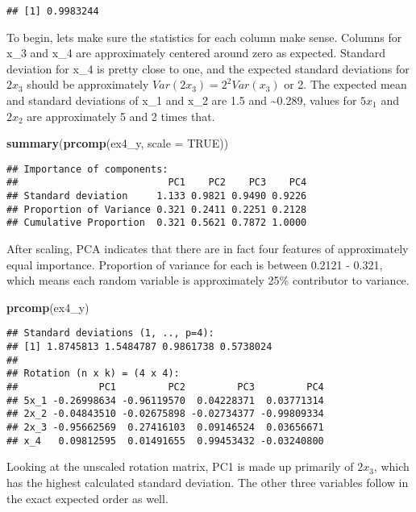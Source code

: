 \documentclass[
]{article}
\newenvironment{Shaded}{\begin{snugshade}}{\end{snugshade}}
\newcommand{\DataTypeTok}[1]{\textcolor[rgb]{0.13,0.29,0.53}{#1}}
\newcommand{\KeywordTok}[1]{\textcolor[rgb]{0.13,0.29,0.53}{\textbf{#1}}}
\newcommand{\NormalTok}[1]{#1}
\newcommand{\OtherTok}[1]{\textcolor[rgb]{0.56,0.35,0.01}{#1}}
\begin{document}
\begin{verbatim}
## [1] 0.9983244
\end{verbatim}

To begin, lets make sure the statistics for each column make sense.
Columns for x\_3 and x\_4 are approximately centered around zero as
expected. Standard deviation for x\_4 is pretty close to one, and the
expected standard deviations for \(2x_3\) should be approximately
\(Var(2x_3) = 2^2 Var(x_3)\) or 2. The expected mean and standard
deviations of x\_1 and x\_2 are 1.5 and \textasciitilde0.289, values for
\(5x_1\) and \(2x_2\) are approximately 5 and 2 times that.

\begin{Shaded}
\begin{Highlighting}[]
\KeywordTok{summary}\NormalTok{(}\KeywordTok{prcomp}\NormalTok{(ex4\_y, }\DataTypeTok{scale =} \OtherTok{TRUE}\NormalTok{))}
\end{Highlighting}
\end{Shaded}

\begin{verbatim}
## Importance of components:
##                          PC1    PC2    PC3    PC4
## Standard deviation     1.133 0.9821 0.9490 0.9226
## Proportion of Variance 0.321 0.2411 0.2251 0.2128
## Cumulative Proportion  0.321 0.5621 0.7872 1.0000
\end{verbatim}

After scaling, PCA indicates that there are in fact four features of
approximately equal importance. Proportion of variance for each is
between 0.2121 - 0.321, which means each random variable is
approximately 25\% contributor to variance.

\begin{Shaded}
\begin{Highlighting}[]
\KeywordTok{prcomp}\NormalTok{(ex4\_y)}
\end{Highlighting}
\end{Shaded}

\begin{verbatim}
## Standard deviations (1, .., p=4):
## [1] 1.8745813 1.5484787 0.9861738 0.5738024
## 
## Rotation (n x k) = (4 x 4):
##              PC1         PC2         PC3         PC4
## 5x_1 -0.26998634 -0.96119570  0.04228371  0.03771314
## 2x_2 -0.04843510 -0.02675898 -0.02734377 -0.99809334
## 2x_3 -0.95662569  0.27416103  0.09146524  0.03656671
## x_4   0.09812595  0.01491655  0.99453432 -0.03240800
\end{verbatim}

Looking at the unscaled rotation matrix, PC1 is made up primarily of
\(2x_3\), which has the highest calculated standard deviation. The other
three variables follow in the exact expected order as well.
\end{document}
